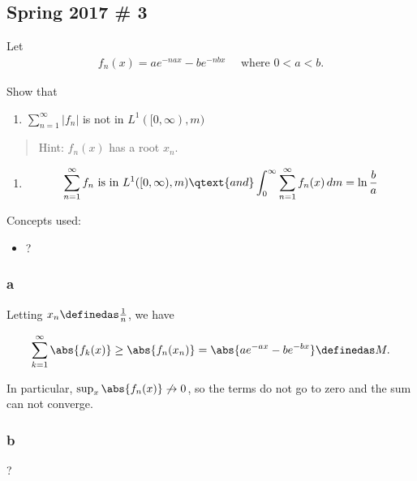 \hypertarget{spring-2017-3}{%
\subsection{Spring 2017 \# 3}\label{spring-2017-3}}

Let
\begin{align*}
f_{n}(x) = a e^{-n a x} - b e^{-n b x} \quad \text{ where } 0 < a < b.
\end{align*}

Show that

\begin{enumerate}
\def\labelenumi{\alph{enumi}.}
\tightlist
\item
  \(\sum_{n=1}^{\infty} \left|f_{n}\right|\) is not in
  \(L^{1}([0, \infty), m)\)
\end{enumerate}

\begin{quote}
Hint: \(f_n(x)\) has a root \(x_n\).
\end{quote}

\begin{enumerate}
\def\labelenumi{\alph{enumi}.}
\setcounter{enumi}{1}
\tightlist
\item

  \begin{align*}
  \sum_{n=1}^{\infty} f_{n} \text { is in } L^{1}([0, \infty), m) 
  \qtext{and}
  \int _{0}^{\infty} \sum _{n=1}^{\infty} f_{n}(x) \,dm = \ln \frac{b}{a}
  \end{align*} 
\end{enumerate}

\begin{solution}

Concepts used:

\begin{itemize}
\tightlist
\item
  ?
\end{itemize}

\hypertarget{a-3}{%
\subsubsection{a}\label{a-3}}

Letting \(x_n \definedas \frac 1 n\), we have

\begin{align*}
\sum_{k=1}^\infty \abs{f_k(x)} \geq \abs{f_n(x_n)} 
=\abs{ae^{-ax} - be^{-bx}} \definedas M
.\end{align*}

In particular, \(\sup_{x} \abs{f_n(x)} \not\to 0\), so the terms do not
go to zero and the sum can not converge.

\hypertarget{b-3}{%
\subsubsection{b}\label{b-3}}

?

\end{solution}

